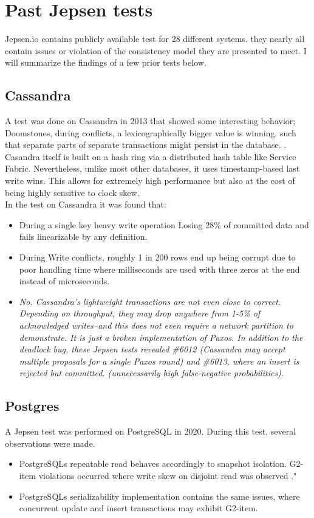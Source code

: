 \documentclass[a4paper,10pt,titlepage]{report}
\begin{document}
\section{Past Jepsen tests}
Jepsen.io contains publicly available test for 28 different systems. they nearly all contain issues or violation of the consistency model they are presented to meet. I will summarize the findings of a few prior tests below.
\subsection{Cassandra}
A test was done on Cassandra\cite{jepsencassandra} in 2013 that showed some interesting behavior; Doomstones, during conflicts, a lexicographically bigger value is winning. such that separate parts of separate transactions might persist in the database. .\\
\vspace{5mm}
Casandra itself is built on a hash ring via a distributed hash table like Service Fabric. Nevertheless, unlike most other databases, it uses timestamp-based last write wins. This allows for extremely high performance but also at the cost of being highly sensitive to clock skew.\\

In the test on Cassandra it was found that:
\begin{itemize}
    \item During a single key heavy write operation Losing 28\% of committed data and fails linearizable by any definition.
    \item During Write conflicts, roughly 1 in 200 rows end up being corrupt due to poor handling time where milliseconds are used with three zeros at the end instead of microseconds.
    \item \textit{No. Cassandra's lightweight transactions are not even close to correct. Depending on throughput, they may drop anywhere from 1-5\% of acknowledged writes–and this does not even require a network partition to demonstrate. It is just a broken implementation of Paxos. In addition to the deadlock bug, these Jepsen tests revealed \#6012 (Cassandra may accept multiple proposals for a single Paxos round) and \#6013, where an insert is rejected but committed. (unnecessarily high false-negative probabilities).}
\end{itemize}

\subsection{Postgres}
A Jepsen test\cite{jepsenpostgresql} was performed on PostgreSQL in 2020. During this test, several observations were made.
\begin{itemize}
    \item PostgreSQLs repeatable read behaves accordingly to snapshot isolation. G2-item violations occurred where write skew on disjoint read was observed ."
    \item PostgreSQLs serializability implementation contains the same issues, where concurrent update and insert transactions may exhibit G2-item.
\end{itemize}
\end{document}
